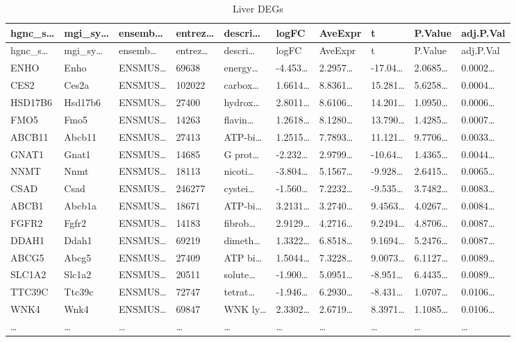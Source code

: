 \documentclass[
]{article}
\begin{document}
\begin{longtable}[]{@{}llllllllll@{}}
\caption{\label{tab:Liver-DEGs}Liver DEGs}\tabularnewline
\toprule
hgnc\_s\ldots{} & mgi\_sy\ldots{} & ensemb\ldots{} & entrez\ldots{} & descri\ldots{} & logFC & AveExpr & t & P.Value & adj.P.Val\tabularnewline
\midrule
\endfirsthead
\toprule
hgnc\_s\ldots{} & mgi\_sy\ldots{} & ensemb\ldots{} & entrez\ldots{} & descri\ldots{} & logFC & AveExpr & t & P.Value & adj.P.Val\tabularnewline
\midrule
\endhead
ENHO & Enho & ENSMUS\ldots{} & 69638 & energy\ldots{} & -4.453\ldots{} & 2.2957\ldots{} & -17.04\ldots{} & 2.0685\ldots{} & 0.0002\ldots{}\tabularnewline
CES2 & Ces2a & ENSMUS\ldots{} & 102022 & carbox\ldots{} & 1.6614\ldots{} & 8.8361\ldots{} & 15.281\ldots{} & 5.6258\ldots{} & 0.0004\ldots{}\tabularnewline
HSD17B6 & Hsd17b6 & ENSMUS\ldots{} & 27400 & hydrox\ldots{} & 2.8011\ldots{} & 8.6106\ldots{} & 14.201\ldots{} & 1.0950\ldots{} & 0.0006\ldots{}\tabularnewline
FMO5 & Fmo5 & ENSMUS\ldots{} & 14263 & flavin\ldots{} & 1.2618\ldots{} & 8.1280\ldots{} & 13.790\ldots{} & 1.4285\ldots{} & 0.0007\ldots{}\tabularnewline
ABCB11 & Abcb11 & ENSMUS\ldots{} & 27413 & ATP-bi\ldots{} & 1.2515\ldots{} & 7.7893\ldots{} & 11.121\ldots{} & 9.7706\ldots{} & 0.0033\ldots{}\tabularnewline
GNAT1 & Gnat1 & ENSMUS\ldots{} & 14685 & G prot\ldots{} & -2.232\ldots{} & 2.9799\ldots{} & -10.64\ldots{} & 1.4365\ldots{} & 0.0044\ldots{}\tabularnewline
NNMT & Nnmt & ENSMUS\ldots{} & 18113 & nicoti\ldots{} & -3.804\ldots{} & 5.1567\ldots{} & -9.928\ldots{} & 2.6415\ldots{} & 0.0065\ldots{}\tabularnewline
CSAD & Csad & ENSMUS\ldots{} & 246277 & cystei\ldots{} & -1.560\ldots{} & 7.2232\ldots{} & -9.535\ldots{} & 3.7482\ldots{} & 0.0083\ldots{}\tabularnewline
ABCB1 & Abcb1a & ENSMUS\ldots{} & 18671 & ATP-bi\ldots{} & 3.2131\ldots{} & 3.2740\ldots{} & 9.4563\ldots{} & 4.0267\ldots{} & 0.0084\ldots{}\tabularnewline
FGFR2 & Fgfr2 & ENSMUS\ldots{} & 14183 & fibrob\ldots{} & 2.9129\ldots{} & 4.2716\ldots{} & 9.2494\ldots{} & 4.8706\ldots{} & 0.0087\ldots{}\tabularnewline
DDAH1 & Ddah1 & ENSMUS\ldots{} & 69219 & dimeth\ldots{} & 1.3322\ldots{} & 6.8518\ldots{} & 9.1694\ldots{} & 5.2476\ldots{} & 0.0087\ldots{}\tabularnewline
ABCG5 & Abcg5 & ENSMUS\ldots{} & 27409 & ATP bi\ldots{} & 1.5044\ldots{} & 7.3228\ldots{} & 9.0073\ldots{} & 6.1127\ldots{} & 0.0089\ldots{}\tabularnewline
SLC1A2 & Slc1a2 & ENSMUS\ldots{} & 20511 & solute\ldots{} & -1.900\ldots{} & 5.0951\ldots{} & -8.951\ldots{} & 6.4435\ldots{} & 0.0089\ldots{}\tabularnewline
TTC39C & Ttc39c & ENSMUS\ldots{} & 72747 & tetrat\ldots{} & -1.946\ldots{} & 6.2930\ldots{} & -8.431\ldots{} & 1.0707\ldots{} & 0.0106\ldots{}\tabularnewline
WNK4 & Wnk4 & ENSMUS\ldots{} & 69847 & WNK ly\ldots{} & 2.3302\ldots{} & 2.6719\ldots{} & 8.3971\ldots{} & 1.1085\ldots{} & 0.0106\ldots{}\tabularnewline
\ldots{} & \ldots{} & \ldots{} & \ldots{} & \ldots{} & \ldots{} & \ldots{} & \ldots{} & \ldots{} & \ldots{}\tabularnewline
\bottomrule
\end{longtable}
\end{document}
